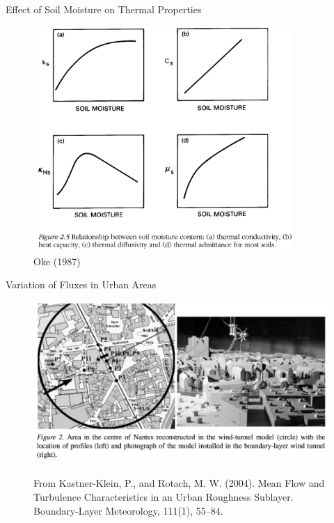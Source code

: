 
\begin{frame}{Effect of Soil Moisture on Thermal Properties}

\begin{figure}
\includegraphics[width=0.88\textwidth]{fig7}
\centering \tiny~\\Oke (1987)
\end{figure}
\end{frame}


\begin{frame}{Variation of Fluxes in Urban Areas}

\begin{figure}
\includegraphics[width=\textwidth]{fig8}
\centering \tiny~\\From Kastner-Klein, P., and Rotach, M. W. (2004). Mean Flow and Turbulence Characteristics in an Urban Roughness Sublayer. Boundary-Layer Meteorology, 111(1), 55–84. 
\end{figure}
\end{frame}

